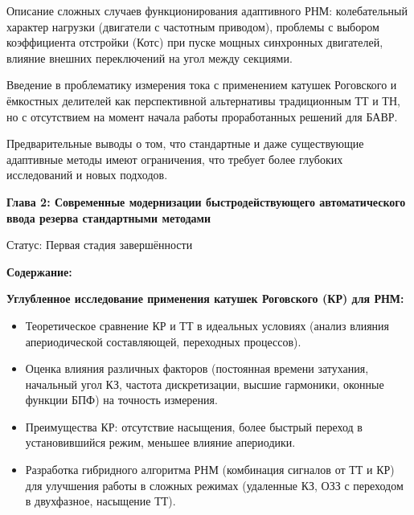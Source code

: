 Описание сложных случаев функционирования адаптивного РНМ: колебательный характер нагрузки (двигатели с частотным приводом), проблемы с выбором коэффициента отстройки (Котс) при пуске мощных синхронных двигателей, влияние внешних переключений на угол между секциями.\par\vspace{0.2cm}
Введение в проблематику измерения тока с применением катушек Роговского и ёмкостных делителей как перспективной альтернативы традиционным ТТ и ТН, но с отсутствием на момент начала работы проработанных решений для БАВР.\par\vspace{0.2cm}
Предварительные выводы о том, что стандартные и даже существующие адаптивные методы имеют ограничения, что требует более глубоких исследований и новых подходов.\par\vspace{0.2cm}
\par\vspace{0.3cm}
\noindent\textbf{Глава 2: Современные модернизации быстродействующего автоматического ввода резерва стандартными методами}\par\vspace{0.2cm}
Статус: Первая стадия завершённости\par\vspace{0.2cm}
\noindent\textbf{Содержание:}\par\vspace{0.2cm}
\noindent\textbf{Углубленное исследование применения катушек Роговского (КР) для РНМ:}\par\vspace{0.2cm}
\begin{itemize}
  \item Теоретическое сравнение КР и ТТ в идеальных условиях (анализ влияния апериодической составляющей, переходных процессов).
  \item Оценка влияния различных факторов (постоянная времени затухания, начальный угол КЗ, частота дискретизации, высшие гармоники, оконные функции БПФ) на точность измерения.
  \item Преимущества КР: отсутствие насыщения, более быстрый переход в установившийся режим, меньшее влияние апериодики.
  \item Разработка гибридного алгоритма РНМ (комбинация сигналов от ТТ и КР) для улучшения работы в сложных режимах (удаленные КЗ, ОЗЗ с переходом в двухфазное, насыщение ТТ).
\end{itemize}

